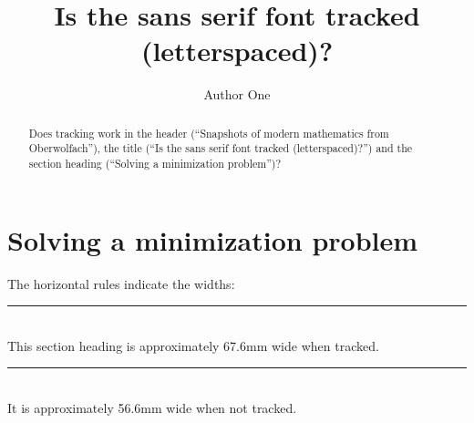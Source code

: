 \documentclass{snapshotmfo}
\author{Author One}
\title{Is the sans serif font tracked (letterspaced)?}
\begin{document}

\begin{abstract}
\texorpdfstring{Does tracking work in the header (``Snapshots of modern mathematics from Oberwolfach''),
the title (``Is the sans serif font tracked (letterspaced)?'')
and the section heading (``Solving a minimization problem'')?
}{Does tracking work in the header ("Snapshots of modern [...]"), the title ("Is the sans serif [...]") and the section heading ("Solving a [...]")?
}
\end{abstract}

\section{Solving a minimization problem}
The horizontal rules indicate the widths: \\
\rule{67.6mm}{2mm} \\
This section heading is approximately 67.6mm wide when tracked. \\
\rule{56.6mm}{2mm} \\
It is approximately 56.6mm wide when not tracked.
\end{document}
